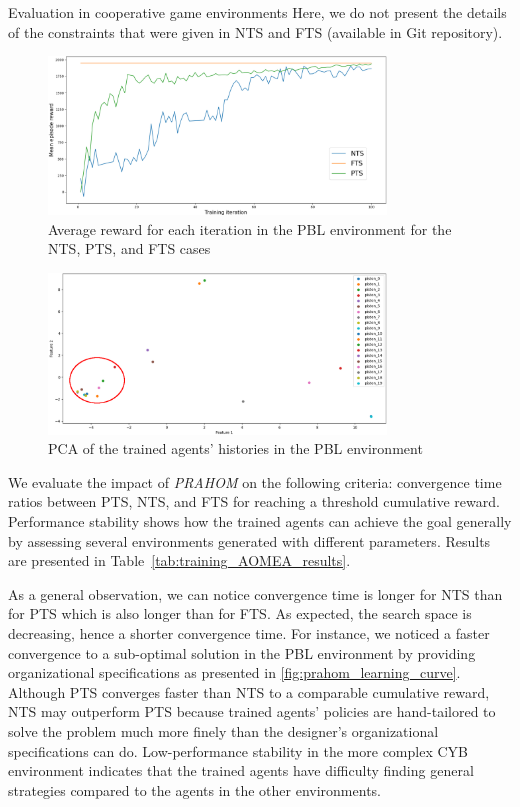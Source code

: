 \begin{frame}{Evaluation in cooperative game environments}
    \noindent Here, we do not present the details of the constraints that were given in NTS and FTS (available in Git repository\footnotemark[1]).
    \begin{figure}[h!]
        \centering
        \includegraphics[width=0.8\textwidth]{figures/prahom_learning_curve.png}
        \caption{Average reward for each iteration in the PBL environment for the NTS, PTS, and FTS cases}
        \label{fig:prahom_learning_curve}
    \end{figure}
    \begin{figure}[h!]
        \centering
        \includegraphics[width=0.8\textwidth]{figures/prahom_pca_analysis.png}
        \caption{PCA of the trained agents' histories in the PBL environment}
        \label{fig:prahom_pca_analysis}
    \end{figure}
    We evaluate the impact of \emph{PRAHOM} on the following criteria: convergence time ratios between PTS, NTS, and FTS for reaching a threshold cumulative reward. Performance stability shows how the trained agents can achieve the goal generally by assessing several environments generated with different parameters. Results are presented in Table~\ref{tab:training_AOMEA_results}.
    
    As a general observation, we can notice convergence time is longer for NTS than for PTS which is also longer than for FTS. As expected, the search space is decreasing, hence a shorter convergence time. For instance, we noticed a faster convergence to a sub-optimal solution in the PBL environment by providing organizational specifications as presented in \autoref{fig:prahom_learning_curve}. Although PTS converges faster than NTS to a comparable cumulative reward, NTS may outperform PTS because trained agents' policies are hand-tailored to solve the problem much more finely than the designer's organizational specifications can do. Low-performance stability in the more complex CYB environment indicates that the trained agents have difficulty finding general strategies compared to the agents in the other environments.


\end{frame}
